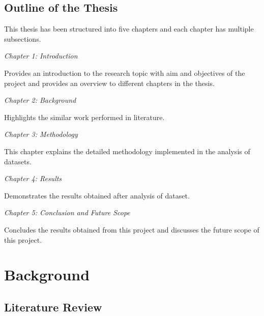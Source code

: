 \documentclass[
  a4paper,
]{article}
\begin{document}
\hypertarget{outline-of-the-thesis}{%
\subsection{Outline of the Thesis}\label{outline-of-the-thesis}}

This thesis has been structured into five chapters and each chapter has
multiple subsections.

\emph{Chapter 1: Introduction}

Provides an introduction to the research topic with aim and objectives
of the project and provides an overview to different chapters in the
thesis.

\emph{Chapter 2: Background}

Highlights the similar work performed in literature.

\emph{Chapter 3: Methodology}

This chapter explains the detailed methodology implemented in the
analysis of datasets.

\emph{Chapter 4: Results}

Demonstrates the results obtained after analysis of dataset.

\emph{Chapter 5: Conclusion and Future Scope}

Concludes the results obtained from this project and discusses the
future scope of this project.

\newpage

\hypertarget{background}{%
\section{Background}\label{background}}

\hypertarget{literature-review}{%
\subsection{Literature Review}\label{literature-review}}
\end{document}
